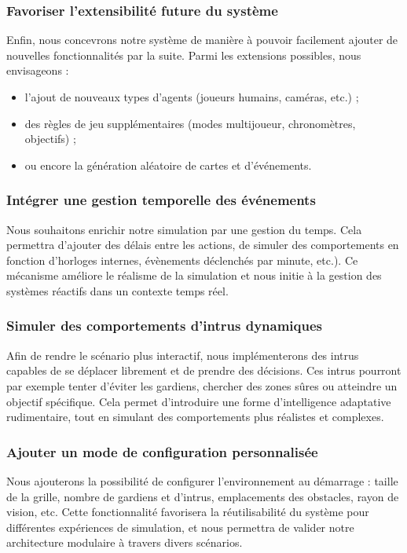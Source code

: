 \subsubsection{ Favoriser l’extensibilité future du système}

Enfin, nous concevrons notre système de manière à pouvoir facilement ajouter de nouvelles fonctionnalités par la suite. Parmi les extensions possibles, nous envisageons :
\begin{itemize}
    \item l’ajout de nouveaux types d’agents (joueurs humains, caméras, etc.) ;
    \item des règles de jeu supplémentaires (modes multijoueur, chronomètres, objectifs) ;
    \item ou encore la génération aléatoire de cartes et d’événements.


\end{itemize}
\subsubsection{ Intégrer une gestion temporelle des événements}

Nous souhaitons enrichir notre simulation par une gestion du temps. Cela permettra d’ajouter des délais entre les actions, de simuler des comportements en fonction d’horloges internes, évènements déclenchés par minute, etc.). Ce mécanisme améliore le réalisme de la simulation et nous initie à la gestion des systèmes réactifs dans un contexte temps réel.

\subsubsection{Simuler des comportements d'intrus dynamiques}

Afin de rendre le scénario plus interactif, nous implémenterons des intrus capables de se déplacer librement et de prendre des décisions. Ces intrus pourront par exemple tenter d’éviter les gardiens, chercher des zones sûres ou atteindre un objectif spécifique. Cela permet d’introduire une forme d’intelligence adaptative rudimentaire, tout en simulant des comportements plus réalistes et complexes.

\subsubsection{ Ajouter un mode de configuration personnalisée}

Nous ajouterons la possibilité de configurer l’environnement au démarrage : taille de la grille, nombre de gardiens et d’intrus, emplacements des obstacles, rayon de vision, etc. Cette fonctionnalité favorisera la réutilisabilité du système pour différentes expériences de simulation, et nous permettra de valider notre architecture modulaire à travers divers scénarios.


